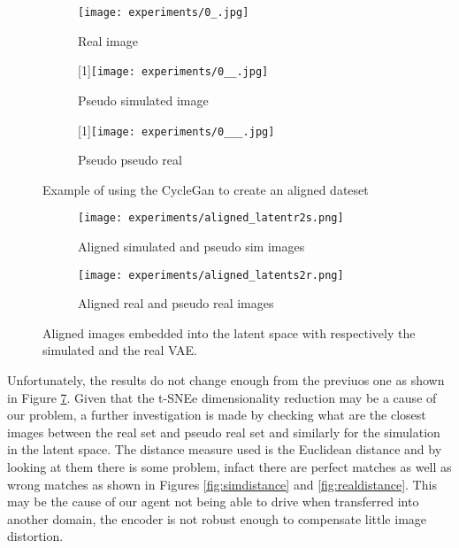 \begin{figure}[h]
  \centering
  \begin{subfigure}{.33\linewidth}
      \centering
      \texttt{[image: experiments/0\_.jpg]}
      \caption{Real image}\label{fig:real}
  \end{subfigure}%
      \hfill
  \begin{subfigure}{.33\linewidth}
      \centering
      \scalebox{-1}[1]{\texttt{[image: experiments/0\_\_.jpg]}}
      \caption{Pseudo simulated image}\label{fig:psim}
  \end{subfigure}%
  \hfill
  \begin{subfigure}{.33\linewidth}
    \centering
    \scalebox{-1}[1]{\texttt{[image: experiments/0\_\_\_.jpg]}}
    \caption{Pseudo pseudo real}\label{fig:ppreal}
  \end{subfigure} 
  \caption{Example of using the CycleGan to create an aligned dateset}
  \label{fig:examplealigned}
\end{figure}

\begin{figure}[h]
  \centering
  \begin{subfigure}{.5\linewidth}
      \centering
      \texttt{[image: experiments/aligned\_latentr2s.png]}
      \caption{Aligned simulated and pseudo sim images}\label{fig:aligen_latentr2s}
  \end{subfigure}%
      \hfill
  \begin{subfigure}{.5\linewidth}
      \centering
      \texttt{[image: experiments/aligned\_latents2r.png]}
      \caption{Aligned real and pseudo real images}\label{fig:aligen_latents2r}
  \end{subfigure}
  \caption{Aligned images embedded into the latent space with respectively the simulated and the real VAE.}
  \label{fig:latentpseudoaligned}
\end{figure}
Unfortunately, the results do not change enough from the previuos one as shown in Figure \ref{fig:latentpseudoaligned}. Given that the t-SNEe dimensionality reduction may be a cause of our problem, a further investigation is made by checking what are the closest images between the real set and pseudo real set and similarly for the simulation in the latent space. The distance measure used is the Euclidean distance and by looking at them there is some problem, infact there are perfect matches as well as wrong matches as shown in Figures \ref{fig:simdistance} and \ref{fig:realdistance}. This may be the cause of our agent not being able to drive when transferred into another domain, the encoder is not robust enough to compensate little image distortion.

